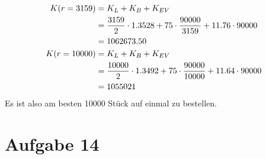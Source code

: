 \documentclass{article}
\begin{document}
\begin{enumerate}[label=(\alph*)]
		\begin{align}
			K(r=3159) &= K_L + K_B + K_{EV} \notag \\
			&= \frac{3159}{2}\cdot 1.3528 + 75\cdot \frac{90000}{3159} + 11.76\cdot 90000 \notag \\
			&= 1062673.50 \notag \\
			K(r=10000) &= K_L + K_B + K_{EV} \notag \\
			&= \frac{10000}{2}\cdot 1.3492 + 75\cdot \frac{90000}{10000} + 11.64\cdot 90000 \notag \\
			&= 1055021 \notag
		\end{align}
		Es ist also am besten 10000 Stück auf einmal zu bestellen.
	\end{enumerate}
	
	\section*{Aufgabe 14}
\end{document}

